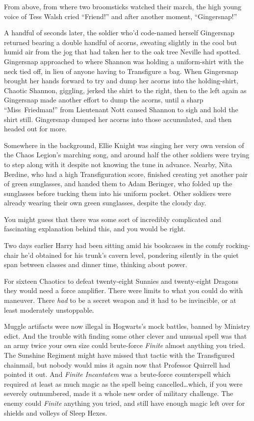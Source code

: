 From above, from where two broomsticks watched their march, the high young
voice of Tess Walsh cried “Friend!” and after another moment, “Gingersnap!”

A handful of seconds later, the soldier who’d code-named herself Gingersnap
returned bearing a double handful of acorns, sweating slightly in the cool but
humid air from the jog that had taken her to the oak tree Neville had spotted.
Gingersnap approached to where Shannon was holding a uniform-shirt with the
neck tied off, in lieu of anyone having to Transfigure a bag. When Gingersnap
brought her hands forward to try and dump her acorns into the holding-shirt,
Chaotic Shannon, giggling, jerked the shirt to the right, then to the left
again as Gingersnap made another effort to dump the acorns, until a sharp
“Miss~Friedman!” from Lieutenant Nott caused Shannon to sigh and hold the shirt
still. Gingersnap dumped her acorns into those accumulated, and then headed out
for more.

Somewhere in the background, Ellie Knight was singing her very own version of
the Chaos Legion’s marching song, and around half the other soldiers were
trying to step along with it despite not knowing the tune in advance. Nearby,
Nita Berdine, who had a high Transfiguration score, finished creating yet
another pair of green sunglasses, and handed them to Adam Beringer, who folded
up the sunglasses before tucking them into his uniform pocket. Other soldiers
were already wearing their own green sunglasses, despite the cloudy day.

You might guess that there was some sort of incredibly complicated and
fascinating explanation behind this, and you would be right.

Two days earlier Harry had been sitting amid his bookcases in the comfy
rocking-chair he’d obtained for his trunk’s cavern level, pondering silently in
the quiet span between classes and dinner time, thinking about power.

For sixteen Chaotics to defeat twenty-eight Sunnies and twenty-eight Dragons
they would need a force amplifier. There were limits to what you could do with
maneuver. There \emph{had} to be a secret weapon and it had to be invincible,
or at least moderately unstoppable.

Muggle artifacts were now illegal in Hogwarts’s mock battles, banned by
Ministry edict. And the trouble with finding some other clever and unusual
spell was that an army twice your own size could brute-force \emph{Finite}
almost anything you tried. The Sunshine Regiment might have missed that tactic
with the Transfigured chainmail, but nobody would miss it again now that
Professor Quirrell had pointed it out. And \emph{Finite Incantatem} was a
brute-force counterspell which required at least as much magic as the spell
being cancelled…which, if you were severely outnumbered, made it a whole
new order of military challenge. The enemy could \emph{Finite} anything you
tried, and still have enough magic left over for shields and volleys of Sleep
Hexes.

